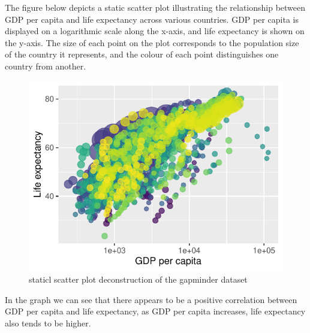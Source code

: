 \documentclass{article}\usepackage[]{graphicx}\usepackage[]{xcolor}
\makeatletter
\def\maxwidth{ %
  \ifdim\Gin@nat@width>\linewidth
    \linewidth
  \else
    \Gin@nat@width
  \fi
}
\newenvironment{knitrout}{}{} %
\numberwithin{equation}{section}
\makeatother
\begin{document}
\noindent
The figure below depicts a static scatter plot illustrating the relationship between GDP per capita and life expectancy across various countries. GDP per capita is displayed on a logarithmic scale along the x-axis, and life expectancy is shown on the y-axis. The size of each point on the plot corresponds to the population size of the country it represents, and the colour of each point distinguishes one country from another.\\

\begin{knitrout}\scriptsize
{}\color{fgcolor}\begin{figure}[H]

{\centering \includegraphics[width=\maxwidth]{figure/beamer-gapminder_static-1} 

}

\caption[staticl scatter plot deconstruction of the gapminder dataset]{staticl scatter plot deconstruction of the gapminder dataset}\label{fig:gapminder_static}
\end{figure}

\end{knitrout}
\noindent
In the graph we can see that there appears to be a positive correlation between GDP per capita and life expectancy, as GDP per capita increases, life expectancy also tends to be higher. \\
\end{document}
